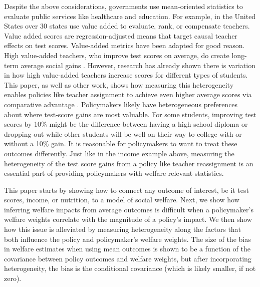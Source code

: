 \documentclass[12pt]{article}
\theoremstyle{definition}
\theoremstyle{definition}
\theoremstyle{definition}
\theoremstyle{definition}
\begin{document}
    Despite the above considerations, governments use mean-oriented statistics to evaluate public services like healthcare and education. For example, in the United States over 30 states use value added to evaluate, rank, or compensate teachers. Value added scores are regression-adjusted means that target causal teacher effects on test scores. Value-added metrics have been adapted for good reason. High value-added teachers, who improve test scores on average, do create long-term average social gains \citep[e.g.,][]{chetty2014measuring2,pope2017multidimensional}. However, research has already shown there is variation in how high value-added teachers increase scores for different types of students\citep[as in][etc.]{Delgado2020,bates2022teacher}. This paper, as well as other work, shows how measuring this heterogeneity enables policies like teacher assignment to achieve even higher average scores via comparative advantage \citep{bates2022teacher, ahn2021importance}. Policymakers likely have heterogeneous preferences about where test-score gains are most valuable. For some students, improving test scores by 10\% might be the difference between having a high school diploma or dropping out while other students will be well on their way to college with or without a 10\% gain. It is reasonable for policymakers to want to treat these outcomes differently. Just like in the income example above, measuring the heterogeneity of the test score gains from a policy like teacher reassignment is an essential part of providing policymakers with welfare relevant statistics. 

    This paper starts by showing how to connect any outcome of interest, be it test scores, income, or nutrition, to a model of social welfare. Next, we show how inferring welfare impacts from average outcomes is difficult when a policymaker's welfare weights correlate with the magnitude of a policy's impact. We then show how this issue is alleviated by measuring heterogeneity along the factors that both influence the policy and policymaker's welfare weights. The size of the bias in welfare estimates when using mean outcomes is shown to be a function of the covariance between policy outcomes and welfare weights, but after incorporating heterogeneity, the bias is the conditional covariance (which is likely smaller, if not zero). 
\end{document}
